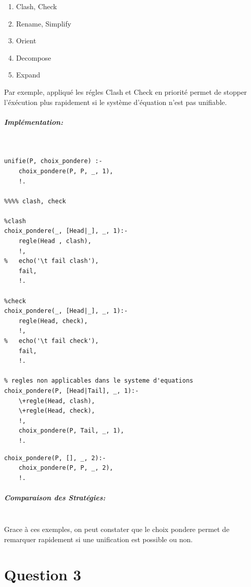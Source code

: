 \documentclass[10pt,a4paper]{report}
\begin{document}
\begin{enumerate}
  \item Clash, Check
  \item Rename, Simplify
  \item Orient
  \item Decompose
  \item Expand
\end{enumerate}
Par exemple, appliqué les régles Clash et Check en priorité permet de stopper l'éxécution plus rapidement si le système d'équation n'est pas unifiable.
\newline

\paragraph{Implémentation:} ~\\

\begin{lstlisting}[caption ={Stratégie choix pondere dans $main.pl$ avec les régles de poids 1}]
% unification choix pondere
unifie(P, choix_pondere) :-
	choix_pondere(P, P, _, 1),
	!.
	
%%%% clash, check

%clash
choix_pondere(_, [Head|_], _, 1):-
	regle(Head , clash),
	!,
%	echo('\t fail clash'),
	fail,
	!.

%check
choix_pondere(_, [Head|_], _, 1):-
	regle(Head, check),
	!,
%	echo('\t fail check'),
	fail,
	!.

% regles non applicables dans le systeme d'equations
choix_pondere(P, [Head|Tail], _, 1):-
	\+regle(Head, clash),
	\+regle(Head, check),
	!,
	choix_pondere(P, Tail, _, 1),
	!.
\end{lstlisting}

\begin{lstlisting}[caption ={Stratégie choix pondere dans $main.pl$, passage aux régles de poids 1 }]
choix_pondere(P, [], _, 2):-
	choix_pondere(P, P, _, 2),
	!.
\end{lstlisting}

\paragraph{Comparaison des Stratégies:} ~\\

Grace à ces exemples, on peut constater que le choix pondere permet de remarquer rapidement si une unification est possible ou non.

\mbox{}
\newpage
\chapter*{Question 3}
\end{document}
